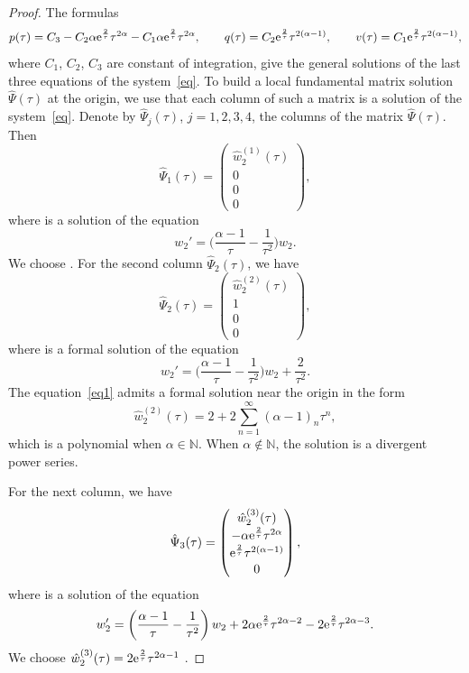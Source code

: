 \documentclass[pdftex]{sigma}
\numberwithin{equation}{section}
\begin{document}
 \begin{proof}
 The formulas
 \[
 p(\tau)=C_3 - C_2 \alpha {\rm e}^{\frac{2}{\tau}} \tau^{2 \alpha} - C_1 \alpha {\rm e}^{\frac{2}{\tau}} \tau^{2 \alpha},\qquad
 q(\tau)=C_2 {\rm e}^{\frac{2}{\tau}} \tau^{2 (\alpha-1)}, \qquad
 v(\tau)=C_1 {\rm e}^{\frac{2}{\tau}} \tau^{2 (\alpha-1)} ,
 \]
 where $C_1$, $C_2$, $C_3$ are constant of integration, give the general solutions of the last three equations of the system~\eqref{eq}.
To build a local fundamental matrix solution $\hat{\Psi}(\tau)$ at the origin, we use that each column of such a matrix is a solution
 of the system~\eqref{eq}.
 Denote by $\hat{\Psi}_j(\tau)$, $j=1, 2, 3, 4$, the columns of the matrix $\hat{\Psi}(\tau)$. Then
 \[
 \hat{\Psi}_1(\tau)=\begin{pmatrix}
 \hat{w}_2^{(1)}(\tau)\\
 0 \\
 0 \\
 0
 \end{pmatrix} ,
 \]
 where  is a solution of the equation
 \[
 w_2'=\biggl(\frac{\alpha-1}{\tau} - \frac{1}{\tau^2}\biggr) w_2 .
 \]
 We choose . For the second column $\hat{\Psi}_2(\tau)$, we have
 \[
 \hat{\Psi}_2(\tau)=\begin{pmatrix}
 \hat{w}_2^{(2)}(\tau)\\
 1 \\
 0 \\
 0
 \end{pmatrix} ,
 \]
 where  is a formal solution of the equation
 \begin{equation}
 w_2'=\biggl(\frac{\alpha-1}{\tau} - \frac{1}{\tau^2}\biggr) w_2 + \frac{2}{\tau^2} .\label{eq1}
 \end{equation}
 The equation~\eqref{eq1} admits a formal solution near the origin in the form
 \[
 \hat{w}_2^{(2)}(\tau)=2 + 2 \sum_{n=1}^{\infty} (\alpha-1)_n \tau^n,
 \]
 which is a polynomial when $\alpha\in\mathbb{N}$. When $\alpha\notin\mathbb{N}$, the solution  is a divergent power series.


 For the next column, we have
 \[
 \hat{\Psi}_3(\tau)=\begin{pmatrix}
 \hat{w}_2^{(3)}(\tau)\\[0.2ex]
 -\alpha {\rm e}^{\frac{2}{\tau}} \tau^{2 \alpha}\\[0.2ex]
 {\rm e}^{\frac{2}{\tau}} \tau^{2 (\alpha-1)}\\[0.2ex]
 0
 \end{pmatrix} ,
 \]
 where  is a solution of the equation
 \[
 w_2'=\left(\frac{\alpha-1}{\tau} - \frac{1}{\tau^2}\right) w_2 + 2 \alpha {\rm e}^{\frac{2}{\tau}} \tau^{2 \alpha-2}
 -2 {\rm e}^{\frac{2}{\tau}} \tau^{2 \alpha -3} .
 \]
 We choose
 $\hat{w}_2^{(3)}(\tau)=2 {\rm e}^{\frac{2}{\tau}} \tau^{2 \alpha -1}$ .


\end{proof}
\end{document}
